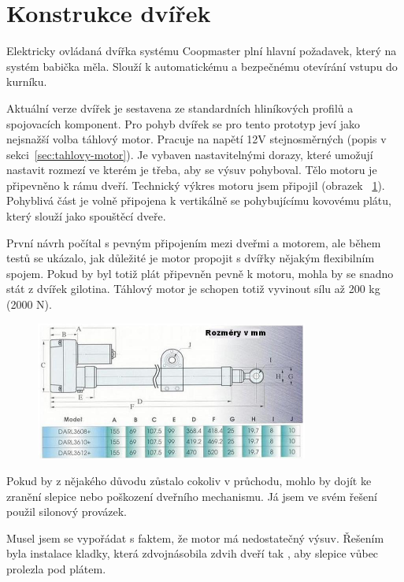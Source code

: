 \section{Konstrukce dvířek}\label{sec:konstrukce-dvirek}
Elektricky ovládaná dvířka systému Coopmaster plní hlavní požadavek, který na systém babička měla.
Slouží k automatickému a bezpečnému otevírání vstupu do kurníku.

Aktuální verze dvířek je sestavena ze standardních hliníkových profilů a spojovacích komponent.
Pro pohyb dvířek se pro tento prototyp jeví jako nejsnažší volba táhlový motor.
Pracuje na napětí 12V stejnosměrných (popis v sekci~\ref{sec:tahlovy-motor}).
Je vybaven nastavitelnými dorazy, které umožují nastavit rozmezí ve kterém je třeba, aby se výsuv pohyboval.
Tělo motoru je připevněno k rámu dveří.
Technický výkres motoru jsem připojil (obrazek ~\ref{fig:instalace_dvere_tahlovy_motor}).
Pohyblivá část je volně připojena k vertikálně se pohybujícímu kovovému plátu, který slouží jako spouštěcí dveře.

První návrh počítal s pevným připojením mezi dveřmi a motorem, ale během testů se ukázalo, jak důležité je motor propojit s dvířky nějakým flexibilním spojem.
Pokud by byl totiž plát připevněn pevně k motoru, mohla by se snadno stát z dvířek gilotina.
Táhlový motor je schopen totiž vyvinout sílu až 200 kg (2000 N).

\begin{figure}[H]
    \centering
    \includegraphics[width=0.8\textwidth]{img/instalace_dvere_tahlovy_motor}
    \label{fig:instalace_dvere_tahlovy_motor}
\end{figure}

Pokud by z nějakého důvodu zůstalo cokoliv v průchodu, mohlo by dojít ke zranění slepice nebo poškození dveřního mechanismu.
Já jsem ve svém řešení použil silonový provázek.

Musel jsem se vypořádat s faktem, že motor má nedostatečný výsuv.
Řešením byla instalace kladky, která zdvojnásobila zdvih dveří tak , aby slepice vůbec prolezla pod plátem.

